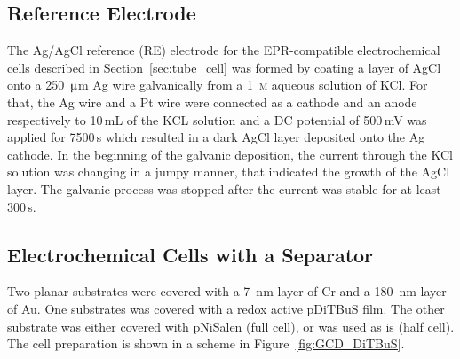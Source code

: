 \subsection{Reference Electrode}
\label{sec:re_prep}
The Ag/AgCl reference (RE) electrode for the EPR-compatible electrochemical cells described in Section~\ref{sec:tube_cell} was formed by coating a layer of AgCl onto a 250~$\muup$m Ag wire galvanically from a 1~\textsc{m} aqueous solution of KCl. For that, the Ag wire and a Pt wire were connected as a cathode and an anode respectively to 10$\,$mL of the KCL solution and a DC potential of 500$\,$mV was applied for 7500$\,$s which resulted in a dark AgCl layer deposited onto the Ag cathode. In the beginning of the galvanic deposition, the current through the KCl solution was changing in a jumpy manner, that indicated the growth of the AgCl layer. The galvanic process was stopped after the current was stable for at least 300$\,$s.\\

\subsection{Electrochemical Cells with a Separator}
Two planar substrates were covered with a 7~nm layer of Cr and a 180~nm layer of Au. One substrates was covered with a redox active pDiTBuS film. The other substrate was either covered with pNiSalen (full cell), or was used as is (half cell). The cell preparation is shown in a scheme in Figure~\ref{fig:GCD_DiTBuS}.

